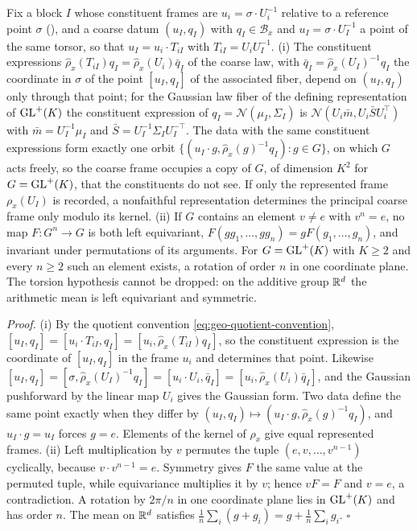 Fix a block $I$ whose constituent frames are $u_i=\sigma\cdot U_i^{-1}$ relative to a reference point
$\sigma$ (), and a coarse datum $(u_I,q_I)$ with $q_I\in\mathcal B_x$ and
$u_I=\sigma\cdot U_I^{-1}$ a point of the same torsor, so that $u_I=u_i\cdot T_{iI}$ with
$T_{iI}=U_iU_I^{-1}$. (i) The constituent expressions
$\widehat\rho_x(T_{iI})q_I=\widehat\rho_x(U_i)\bar q_I$ of the coarse law, with
$\bar q_I=\widehat\rho_x(U_I)^{-1}q_I$ the coordinate in $\sigma$ of the point $[u_I,q_I]$ of the associated
fiber, depend on $(u_I,q_I)$ only through that point; for the Gaussian law fiber of the defining
representation of $\mathrm{GL}^+(K)$ the constituent expression of $q_I=\mathcal N(\mu_I,\Sigma_I)$ is
$\mathcal N(U_i\bar m,U_i\bar SU_i^\top)$ with $\bar m=U_I^{-1}\mu_I$ and $\bar S=U_I^{-1}\Sigma_IU_I^{-\top}$.
The data with the same constituent expressions form exactly one orbit
$\{(u_I\cdot g,\widehat\rho_x(g)^{-1}q_I):g\in G\}$, on which $G$ acts freely, so the coarse frame occupies a
copy of $G$, of dimension $K^2$ for $G=\mathrm{GL}^+(K)$, that the constituents do not see. If only the represented
frame $\rho_x(U_I)$ is recorded, a nonfaithful representation determines the principal coarse frame only
modulo its kernel. (ii) If $G$ contains an element $v\neq e$ with $v^n=e$, no map $F:G^n\to G$ is both left
equivariant, $F(gg_1,\ldots,gg_n)=gF(g_1,\ldots,g_n)$, and invariant under permutations of its arguments. For
$G=\mathrm{GL}^+(K)$ with $K\geq2$ and every $n\geq2$ such an element exists, a rotation of order $n$ in one
coordinate plane. The torsion hypothesis cannot be dropped: on the additive group $\mathbb R^d$ the arithmetic
mean is left equivariant and symmetric. 

\noindent\emph{Proof.}
(i) By the quotient convention \eqref{eq:geo-quotient-convention},
$[u_I,q_I]=[u_i\cdot T_{iI},q_I]=[u_i,\widehat\rho_x(T_{iI})q_I]$, so the constituent expression is the
coordinate of $[u_I,q_I]$ in the frame $u_i$ and determines that point. Likewise
$[u_I,q_I]=[\sigma,\widehat\rho_x(U_I)^{-1}q_I]=[u_i\cdot U_i,\bar q_I]=[u_i,\widehat\rho_x(U_i)\bar q_I]$, and
the Gaussian pushforward by the linear map $U_i$ gives the Gaussian form. Two data define the same
point exactly when they differ by $(u_I,q_I)\mapsto(u_I\cdot g,\widehat\rho_x(g)^{-1}q_I)$, and
$u_I\cdot g=u_I$ forces $g=e$. Elements of the kernel of $\rho_x$ give equal represented frames. (ii) Left
multiplication by $v$ permutes the tuple $(e,v,\ldots,v^{n-1})$ cyclically, because $v\cdot v^{n-1}=e$.
Symmetry gives $F$ the same value at the permuted tuple, while equivariance multiplies it by $v$; hence
$vF=F$ and $v=e$, a contradiction. A rotation by $2\pi/n$ in one coordinate plane lies in $\mathrm{GL}^+(K)$ and has
order $n$. The mean on $\mathbb R^d$ satisfies $\tfrac1n\sum_i(g+g_i)=g+\tfrac1n\sum_ig_i$. $\square$

